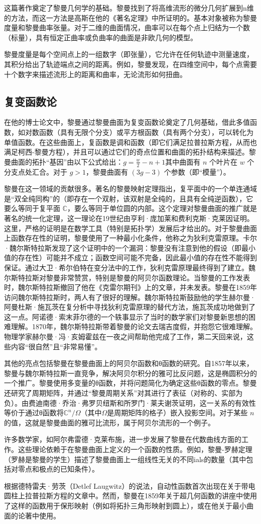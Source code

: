 这篇著作奠定了黎曼几何学的基础。黎曼找到了将高维流形的微分几何扩展到n维的方法，而这一方法是高斯在他的《著名定理》中所证明的。基本对象被称为黎曼度量和黎曼曲率张量。对于二维的曲面情况，曲率可以在每个点上归结为一个数（标量），具有恒定正曲率或负曲率的曲面是非欧几何的模型。

黎曼度量是每个空间点上的一组数字（即张量），它允许在任何轨迹中测量速度，其积分给出了轨迹端点之间的距离。例如，黎曼发现，在四维空间中，每个点需要十个数字来描述流形上的距离和曲率，无论流形如何扭曲。
\subsection{复变函数论}
在他的博士论文中，黎曼通过黎曼曲面为复变函数论奠定了几何基础，借此多值函数，如对数函数（具有无限个分支）或平方根函数（具有两个分支），可以转化为单值函数。在这些曲面上，复函数是调和函数（即它们满足拉普拉斯方程，从而也满足柯西-黎曼方程），并且可以通过它们的奇点位置和曲面的拓扑结构来描述。黎曼曲面的拓扑“基因”由以下公式给出：\(g = \frac{w}{2} - n + 1\)其中曲面有 \(n\) 个叶片在 \(w\) 个分支点处汇合。对于 \(g > 1\)，黎曼曲面有 \((3g - 3)\) 个参数（即“模量”）。

黎曼在这一领域的贡献很多。著名的黎曼映射定理指出，复平面中的一个单连通域是“双全纯同构”的（即存在一个双射，该双射是全纯的，且具有全纯逆函数），它要么等同于复平面 \(\mathbb{C}\)，要么等同于单位圆的内部。这个定理对黎曼曲面的推广就是著名的统一化定理，这一理论在19世纪由亨利·庞加莱和费利克斯·克莱因证明。这里，严格的证明是在数学工具（特别是拓扑学）发展后才给出的。对于黎曼曲面上函数存在性的证明，黎曼使用了一种最小化条件，他称之为狄利克雷原理。卡尔·魏尔斯特拉斯发现了这个证明中的一个漏洞：黎曼没有注意到他的假设（即最小值的存在性）可能并不成立；函数空间可能不完备，因此最小值的存在性不能得到保证。通过大卫·希尔伯特在变分法中的工作，狄利克雷原理最终得到了建立。魏尔斯特拉斯对黎曼非常赞赏，特别是黎曼的阿贝尔函数理论。当黎曼的工作发表时，魏尔斯特拉斯撤回了他在《克雷尔期刊》上的文章，并未发表。黎曼在1859年访问魏尔斯特拉斯时，两人有了很好的理解。魏尔斯特拉斯鼓励他的学生赫尔曼·阿曼杜斯·施瓦茨在复分析中寻找狄利克雷原理的替代方法，施瓦茨成功地做到了这一点。阿诺德·索末菲尔德的一个轶事显示了当时的数学家们对黎曼新思想的困难理解。1870年，魏尔斯特拉斯带着黎曼的论文去瑞吉度假，并抱怨它很难理解。物理学家赫尔曼·冯·亥姆霍兹在一夜之间帮助他完成了工作，第二天回来说，这些内容“很自然”且“非常易懂”。

其他的亮点包括黎曼在黎曼曲面上的阿贝尔函数和θ函数的研究。自1857年以来，黎曼与魏尔斯特拉斯一直竞争，解决阿贝尔积分的雅可比反问题，这是椭圆积分的一个推广。黎曼使用多变量的θ函数，并将问题简化为确定这些θ函数的零点。黎曼还研究了周期矩阵，并通过“黎曼周期关系”对其进行了表征（对称的、实部为负）。由费迪南德·乔治·弗罗贝纽斯和所罗门·莱夫谢茨证明，这一关系的有效性等价于通过θ函数将\(\mathbb{C}^n/\Omega\)（其中\(\Omega\)是周期矩阵的格子）嵌入投影空间。对于某些 \(n\) 的值，这就是黎曼曲面的雅可比流形，属于阿贝尔流形的一个例子。

许多数学家，如阿尔弗雷德·克莱布施，进一步发展了黎曼在代数曲线方面的工作。这些理论依赖于在黎曼曲面上定义的一个函数的性质。例如，黎曼-罗赫定理（罗赫是黎曼的学生）描述了黎曼曲面上一组线性无关的不同ials的数量（其中包括对零点和极点的已知条件）。

根据德特雷夫·劳茨（Detlef Laugwitz）的说法，自动性函数首次出现在关于带电圆柱上拉普拉斯方程的文章中。然而，黎曼在1859年关于超几何函数的讲座中使用了这样的函数用于保形映射（例如将拓扑三角形映射到圆上），或在他关于最小曲面的论著中使用。